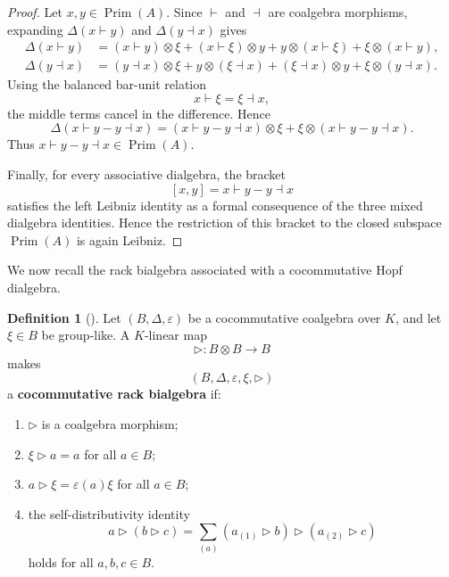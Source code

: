 \documentclass[11pt]{article}
\theoremstyle{plain}
\theoremstyle{definition}
\newtheorem{definition}[theorem]{Definition}
\theoremstyle{remark}
\DeclareMathOperator{\Prim}{Prim}
\begin{document}
	\begin{proof}
		Let \(x,y\in\Prim(A)\). Since \(\vdash\) and \(\dashv\) are coalgebra
		morphisms, expanding \(\Delta(x\vdash y)\) and \(\Delta(y\dashv x)\) gives
		\begin{align*}
			\Delta(x\vdash y)
			&=
			(x\vdash y)\otimes\xi
			+
			(x\vdash\xi)\otimes y
			+
			y\otimes(x\vdash\xi)
			+
			\xi\otimes(x\vdash y),
			\\
			\Delta(y\dashv x)
			&=
			(y\dashv x)\otimes\xi
			+
			y\otimes(\xi\dashv x)
			+
			(\xi\dashv x)\otimes y
			+
			\xi\otimes(y\dashv x).
		\end{align*}
		Using the balanced bar-unit relation
		\[
		x\vdash\xi=\xi\dashv x,
		\]
		the middle terms cancel in the difference. Hence
		\[
		\Delta(x\vdash y-y\dashv x)
		=
		(x\vdash y-y\dashv x)\otimes\xi
		+
		\xi\otimes(x\vdash y-y\dashv x).
		\]
		Thus \(x\vdash y-y\dashv x\in\Prim(A)\).
		
		Finally, for every associative dialgebra, the bracket
		\[
		[x,y]=x\vdash y-y\dashv x
		\]
		satisfies the left Leibniz identity as a formal consequence of the three
		mixed dialgebra identities. Hence the restriction of this bracket to the
		closed subspace \(\Prim(A)\) is again Leibniz.
	\end{proof}
	
	We now recall the rack bialgebra associated with a cocommutative Hopf
	dialgebra.
	
	\begin{definition}[{\cite[Definition~2.1]{ABRW1}}]\label{def:rack-bialgebra}
		Let \((B,\Delta,\varepsilon)\) be a cocommutative coalgebra over \(K\), and
		let \(\xi\in B\) be group-like. A \(K\)-linear map
		\[
		\triangleright:B\otimes B\longrightarrow B
		\]
		makes
		\[
		(B,\Delta,\varepsilon,\xi,\triangleright)
		\]
		a \textbf{cocommutative rack bialgebra} if:
		\begin{enumerate}
			\item \(\triangleright\) is a coalgebra morphism;
			\item \(\xi\triangleright a=a\) for all \(a\in B\);
			\item \(a\triangleright\xi=\varepsilon(a)\xi\) for all \(a\in B\);
			\item the self-distributivity identity
			\[
			a\triangleright(b\triangleright c)
			=
			\sum_{(a)}
			(a_{(1)}\triangleright b)\triangleright
			(a_{(2)}\triangleright c)
			\]
			holds for all \(a,b,c\in B\).
		\end{enumerate}
	\end{definition}
	
\end{document}
